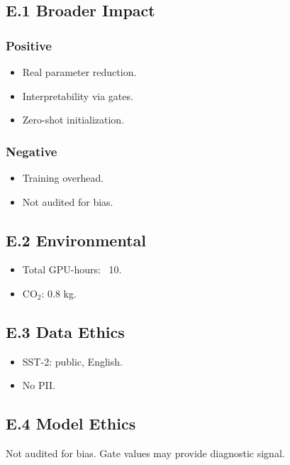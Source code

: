 \subsection{E.1 Broader Impact}

\subsubsection{Positive}
\begin{itemize}
\item Real parameter reduction.
\item Interpretability via gates.
\item Zero-shot initialization.

\end{itemize}
\subsubsection{Negative}
\begin{itemize}
\item Training overhead.
\item Not audited for bias.

\end{itemize}
\subsection{E.2 Environmental}

\begin{itemize}
\item Total GPU-hours: ~10.
\item CO$_2$: 0.8 kg.

\end{itemize}
\subsection{E.3 Data Ethics}

\begin{itemize}
\item SST-2: public, English.
\item No PII.

\end{itemize}
\subsection{E.4 Model Ethics}

Not audited for bias. Gate values may provide diagnostic signal.

